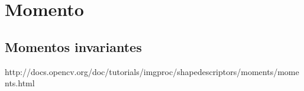 \section{Momento}

\subsection{Momentos invariantes}

http://docs.opencv.org/doc/tutorials/imgproc/shapedescriptors/moments/moments.html
